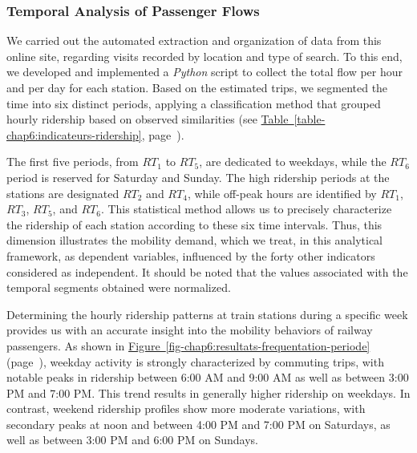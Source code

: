 \begin{refsegment}
\subsubsection*{Temporal Analysis of Passenger Flows
    \label{chap6:methodologie-indicateurs-frequentation-extraction}
    }

We carried out the automated extraction and organization of data from this online site, regarding visits recorded by location and type of search. To this end, we developed and implemented a \textsl{Python} script to collect the total flow per hour and per day for each station. Based on the estimated trips, we segmented the time into six distinct periods, applying a classification method that grouped hourly ridership based on observed similarities (see \hyperref[table-chap6:indicateurs-ridership]{Table~\ref{table-chap6:indicateurs-ridership}}, page~\pageref{table-chap6:indicateurs-ridership}).


The first five periods, from \(RT_{1}\) to \(RT_{5}\), are dedicated to weekdays, while the \(RT_{6}\) period is reserved for Saturday and Sunday. The high ridership periods at the stations are designated \(RT_{2}\) and \(RT_{4}\), while off-peak hours are identified by \(RT_{1}\), \(RT_{3}\), \(RT_{5}\), and \(RT_{6}\). This statistical method allows us to precisely characterize the ridership of each station according to these six time intervals. Thus, this dimension illustrates the mobility demand, which we treat, in this analytical framework, as dependent variables, influenced by the forty other indicators considered as independent. It should be noted that the values associated with the temporal segments obtained were normalized.

Determining the hourly ridership patterns at train stations during a specific week provides us with an accurate insight into the mobility behaviors of railway passengers. As shown in \hyperref[fig-chap6:resultats-frequentation-periode]{Figure~\ref{fig-chap6:resultats-frequentation-periode}} (page~\pageref{fig-chap6:resultats-frequentation-periode}), weekday activity is strongly characterized by commuting trips, with notable peaks in ridership between 6:00 AM and 9:00 AM as well as between 3:00 PM and 7:00 PM. This trend results in generally higher ridership on weekdays. In contrast, weekend ridership profiles show more moderate variations, with secondary peaks at noon and between 4:00 PM and 7:00 PM on Saturdays, as well as between 3:00 PM and 6:00 PM on Sundays.


\end{refsegment}
